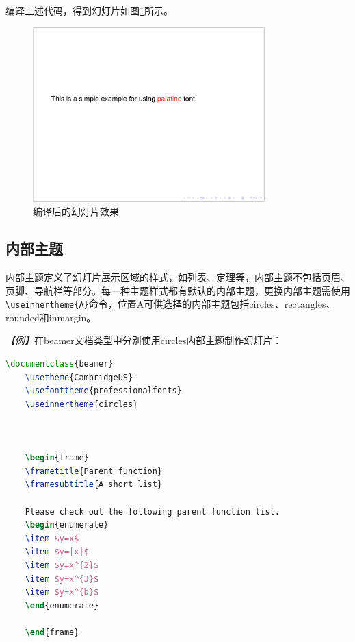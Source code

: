 编译上述代码，得到幻灯片如图\ref{figeg:005}所示。

\begin{figure}[htbp]
    \centering
    \includegraphics[width = 0.8\textwidth]{images/ch_9/example_sec2_4.png}
    \caption{编译后的幻灯片效果}
    \label{figeg:005}
\end{figure}

\subsection{内部主题}

内部主题定义了幻灯片展示区域的样式，如列表、定理等，内部主题不包括页眉、页脚、导航栏等部分。每一种主题样式都有默认的内部主题，更换内部主题需使用\texttt{\textbackslash{}useinnertheme\{A\}}命令，位置A可供选择的内部主题包括circles、rectangles、rounded和inmargin。

\emph{【例】}在beamer文档类型中分别使用circles内部主题制作幻灯片：
\begin{lstlisting}[language=TeX]
    \documentclass{beamer}
    \usetheme{CambridgeUS}
    \usefonttheme{professionalfonts}
    \useinnertheme{circles}

    

    \begin{frame}
    \frametitle{Parent function}
    \framesubtitle{A short list}

    Please check out the following parent function list.
    \begin{enumerate}
    \item $y=x$
    \item $y=|x|$
    \item $y=x^{2}$
    \item $y=x^{3}$
    \item $y=x^{b}$
    \end{enumerate}

    \end{frame}

    
\end{lstlisting}

